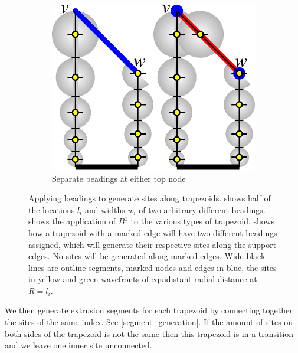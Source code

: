 \begin{figure}
\begin{subfigure}{0.5\columnwidth}
\end{subfigure}
\begin{subfigure}{0.34\columnwidth}\centering
\includegraphics[height=\figheight]{sources/method/trapezoid_beading_separate.pdf}
\caption{Separate beadings at either top node}\label{trapezoid_beading_separate}
\end{subfigure}
\caption{
Applying beadings to generate sites along trapezoids.
 shows half of the locations $l_i$ and widths $w_i$ of two arbitrary different beadings.
 shows the application of $B^1$ to the various types of trapezoid.
 shows how a trapezoid with a marked edge will have two different beadings assigned, which will generate their respective sites along the support edges.
No sites will be generated along marked edges.
Wide black lines are outline segments, marked nodes and edges in blue, the sites in yellow and green wavefronts of equidistant radial distance at $R = l_i$.
}
\label{site_placement}
\end{figure}


We then generate extrusion segments for each trapezoid by connecting together the sites of the same index.
See \cref{segment_generation}.
If the amount of sites on both sides of the trapezoid is not the same then this trapezoid is in a transition and we leave one inner site unconnected.

